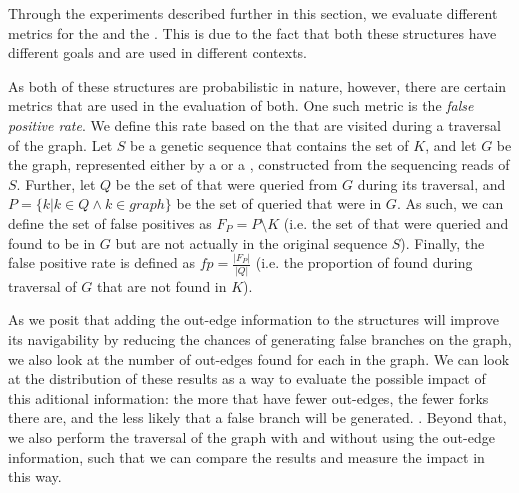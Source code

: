 Through the experiments described further in this section, we evaluate different metrics for the \dBCM and the \dBHT. This is due to
the fact that both these structures have different goals and are used in different contexts.

As both of these structures are probabilistic in nature, however, there are certain metrics that are used in the evaluation of both.
One such metric is the \emph{false positive rate}. We define this rate based on the  that are visited during a 
traversal of the graph. Let $S$ be a genetic sequence that contains the set of  $K$, and let $G$ be the graph, represented
either by a \dBCM or a \dBHT, constructed from the sequencing reads of $S$. Further, let $Q$ be the set of  that were queried
from $G$ during its traversal, and $P=\{k | k \in Q \wedge k \in graph\}$ be the set of queried  that were in $G$. As such, we can
define the set of false positives as $F_P=P \setminus K$ (i.e. the set of  that were queried and found to be in $G$ but are not
actually in the original sequence $S$). Finally, the false positive rate is defined as $\mathit{fp}=\frac{|F_P|}{|Q|}$ (i.e. the
proportion of  found during traversal of $G$ that are not found in $K$).


As we posit that adding the out-edge information to the structures will improve its navigability by reducing the chances of generating
false branches on the graph, we also look at the number of out-edges found for each \kmer in the graph. We can look at the distribution
of these results as a way to evaluate the possible impact of this aditional information: the more  that have fewer out-edges,
the fewer forks there are, and the less likely that a false branch will be generated. . Beyond that, we also perform the traversal of the graph with and
without using the out-edge information, such that we can compare the results and measure the impact in this way.

\subsubsection{\dBCM}

